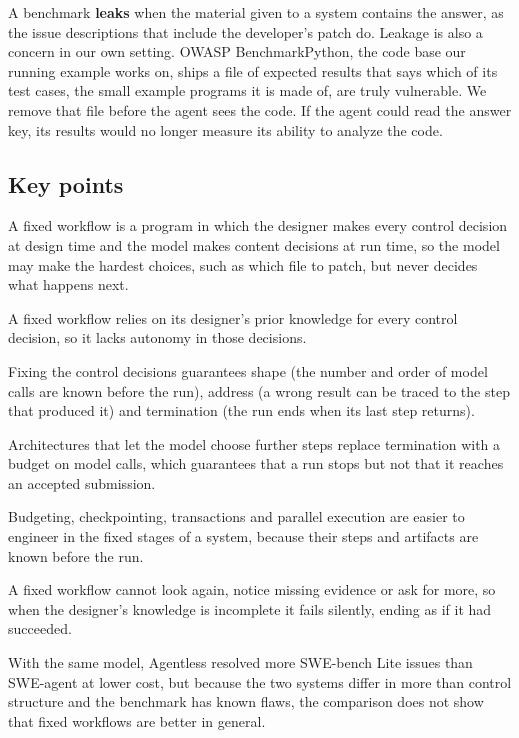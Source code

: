 A benchmark \textbf{leaks} when the material given to a system contains the answer, as the issue
descriptions that include the developer's patch do. Leakage is also a concern in our own setting.
OWASP BenchmarkPython, the code base our running example works on, ships a file of expected results
that says which of its test cases, the small example programs it is made of, are truly vulnerable.
We remove that file before the agent sees the code. If the agent could read the answer key, its
results would no longer measure its ability to analyze the code.

\subsection*{Key points}
\bi
\item A fixed workflow is a program in which the designer makes every control decision at design
time and the model makes content decisions at run time, so the model may make the hardest choices,
such as which file to patch, but never decides what happens next.
\item A fixed workflow relies on its designer's prior knowledge for every control decision, so it
lacks autonomy in those decisions.
\item Fixing the control decisions guarantees shape (the number and order of model calls are known
before the run), address (a wrong result can be traced to the step that produced it) and
termination (the run ends when its last step returns).
\item Architectures that let the model choose further steps replace termination with a budget on
model calls, which guarantees that a run stops but not that it reaches an accepted submission.
\item Budgeting, checkpointing, transactions and parallel execution are easier to engineer in the
fixed stages of a system, because their steps and artifacts are known before the run.
\item A fixed workflow cannot look again, notice missing evidence or ask for more, so when the
designer's knowledge is incomplete it fails silently, ending as if it had succeeded.
\item With the same model, Agentless resolved more SWE-bench Lite issues than SWE-agent at lower
cost, but because the two systems differ in more than control structure and the benchmark has known
flaws, the comparison does not show that fixed workflows are better in general.
\ei
